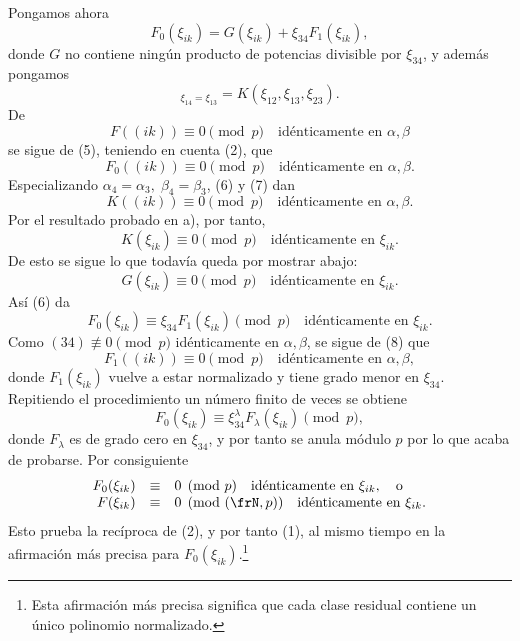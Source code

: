 \documentclass[11pt]{article}
\begin{document}
Pongamos ahora
\begin{equation}
        F_0(\xi_{ik})=G(\xi_{ik})+\xi_{34}F_1(\xi_{ik}),
\end{equation}
donde \(G\) no contiene ningún producto de potencias divisible por \(\xi_{34}\), y además pongamos
\begin{equation}
        [G]_{\xi_{14}=\xi_{13}}=K(\xi_{12},\xi_{13},\xi_{23}).
\end{equation}
De
\[
        F((ik))\equiv0\pmod p\quad \text{idénticamente en \(\alpha,\beta\)}
\]
se sigue de (5), teniendo en cuenta (2), que
\begin{equation}
        F_0((ik))\equiv0\pmod p\quad \text{idénticamente en \(\alpha,\beta\)}.
\end{equation}
Especializando \(\alpha_4=\alpha_3,\;\beta_4=\beta_3\), (6) y (7) dan
\[
        K((ik))\equiv0\pmod p\quad \text{idénticamente en \(\alpha,\beta\)}.
\]
Por el resultado probado en a), por tanto,
\[
        K(\xi_{ik})\equiv0\pmod p\quad \text{idénticamente en \(\xi_{ik}\)}.
\]
De esto se sigue lo que todavía queda por mostrar abajo:
\[
        G(\xi_{ik})\equiv0\pmod p\quad \text{idénticamente en \(\xi_{ik}\)}.
\]
Así (6) da
\[
        F_0(\xi_{ik})\equiv \xi_{34}F_1(\xi_{ik})\pmod p
        \quad \text{idénticamente en \(\xi_{ik}\)}.
\]
Como \((34)\not\equiv0\pmod p\) idénticamente en \(\alpha,\beta\), se sigue de (8) que
\[
        F_1((ik))\equiv0\pmod p\quad \text{idénticamente en \(\alpha,\beta\)},
\]
donde \(F_1(\xi_{ik})\) vuelve a estar normalizado y tiene grado menor en \(\xi_{34}\). Repitiendo el procedimiento un número finito de veces se obtiene
\[
        F_0(\xi_{ik})\equiv\xi_{34}^{\lambda}F_\lambda(\xi_{ik})\pmod p,
\]
donde \(F_\lambda\) es de grado cero en \(\xi_{34}\), y por tanto se anula módulo \(p\) por lo que acaba de probarse. Por consiguiente
\begin{equation}
\begin{array}{rcl}
        F_0(\xi_{ik})&\equiv&0\pmod p\quad \text{idénticamente en \(\xi_{ik}\)},\quad\text{o}\\
        F(\xi_{ik})&\equiv&0\pmod{(\frN,p)}\quad \text{idénticamente en \(\xi_{ik}\)}.
\end{array}
\end{equation}
Esto prueba la recíproca de (2), y por tanto (1), al mismo tiempo en la afirmación más precisa para \(F_0(\xi_{ik})\).\footnote{Esta afirmación más precisa significa que cada clase residual contiene un único polinomio normalizado.}
\end{document}
